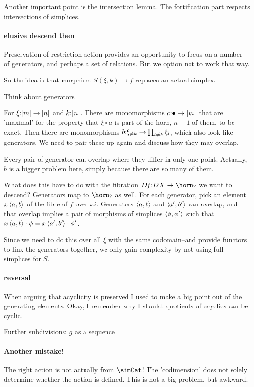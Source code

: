 \documentclass[csh.tex]{subfiles}
\begin{document}
Another important point is the intersection lemma. The fortification part respects intersections of simplices.

\paragraph{elusive descend then}
Preservation of restriction action provides an opportunity to focus on a number of generators, and perhaps a set of relations. But we option not to work that way. 

So the idea is that morphism $S(\xi,k)\to f$ replaces an actual simplex.

Think about generators

For $\xi\mathord : [m]\to[n]$ and $k\mathord : [n]$. There are monomorphisms $a\mathord :\bullet \to [m]$ that are 'maximal' for the property that $\xi\circ a$ is part of the horn, $n - 1$ of them, to be exact. Then there are monomorphisms $b\mathord : \xi_{\neq k} \to \prod_{l\neq k} \xi_l$, which also look like generators. We need to pair these up again and discuss how they may overlap.

Every pair of generator can overlap where they differ in only one point. 
Actually, $b$ is a bigger problem here, simply because there are so many of them.

What does this have to do with the fibration $Df\of DX\to\horn_{?}$ we want to descend?
Generators map to $\horn_{?}$ as well. For each generator, pick an element $x\left\langle a,b \right\rangle$ of the fibre of $f$ over $xi$.
Generators $\left\langle a,b \right\rangle$ and $\left\langle a',b' \right\rangle$ can overlap, and that overlap implies a pair of morphisms of simplices $\left\langle \phi,\phi' \right\rangle$ such that $x\left\langle a,b \right\rangle\cdot \phi = x\left\langle a',b' \right\rangle\cdot \phi'$.

Since we need to do this over all $\xi$ with the same codomain--and provide functors to link the generators together, we only gain complexity by not using full simplices for $S$.

\paragraph{reversal}
When arguing that acyclicity is preserved I used to make a big point out of the generating elements. Okay, I remember why I should: quotients of acyclics can be cyclic.

Further subdivisions: $g$ as a sequence 

\paragraph{Another mistake!}
The right action is not actually from $\simCat$! The 'codimension' does not solely determine whether the action is defined. This is not a big problem, but awkward.
\end{document}
